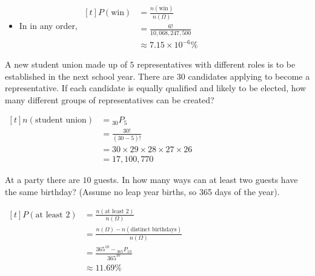 \begin{example}
\begin{enumerate}[label=\alph*)]
\begin{itemize}
            \item In in any order, $\begin{aligned}[t]
                P(\text{win}) & = \frac{n(\text{win})}{n(\Omega)} \\
                              & = \frac{6!}{10,068,247,500}       \\
                              & \approx 7.15 \times 10^{-6} \%
            \end{aligned}$
        \end{itemize}
    \end{enumerate}
\end{example}

\begin{example}
    A new student union made up of $5$ representatives with different roles is to be established in the next school year. There are $30$ candidates applying to become a representative. If each candidate is equally qualified and likely to be elected, how many different groups of representatives can be created?

    $\begin{aligned}[t]
        n(\text{student union}) & = {}_{30}P_5                                 \\
                                & = \frac{30!}{(30-5)!}                        \\
                                & = 30 \times 29 \times 28 \times 27 \times 26 \\
                                & = 17,100,770
    \end{aligned}$
\end{example}

\begin{example}
    At a party there are $10$ guests. In how many ways can at least two guests have the same birthday? (Assume no leap year births, so 365 days of the year).

    $\begin{aligned}[t]
        P(\text{at least } 2) & = \frac{n(\text{at least } 2)}{n(\Omega)}                    \\
                              & = \frac{n(\Omega) - n(\text{distinct birthdays})}{n(\Omega)} \\
                              & = \frac{365^{10} - {}_{365}P_{10}}{365^{10}}                 \\
                              & \approx 11.69 \%
    \end{aligned}$
\end{example}


